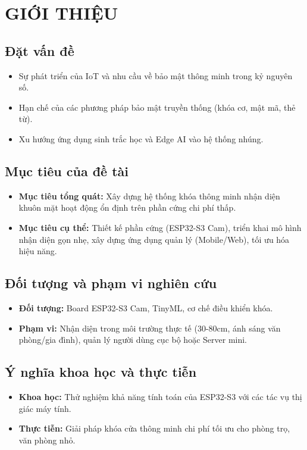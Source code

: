 \documentclass[12pt,a4paper]{report}
\begin{document}
    \chapter{GIỚI THIỆU}
    \section{Đặt vấn đề}
    \begin{itemize}
        \item Sự phát triển của IoT và nhu cầu về bảo mật thông minh trong kỷ nguyên số.
        \item Hạn chế của các phương pháp bảo mật truyền thống (khóa cơ, mật mã, thẻ từ).
        \item Xu hướng ứng dụng sinh trắc học và Edge AI vào hệ thống nhúng.
    \end{itemize}

    \section{Mục tiêu của đề tài}
    \begin{itemize}
        \item \textbf{Mục tiêu tổng quát:} Xây dựng hệ thống khóa thông minh nhận diện khuôn mặt hoạt động ổn định trên phần cứng chi phí thấp.
        \item \textbf{Mục tiêu cụ thể:} Thiết kế phần cứng (ESP32-S3 Cam), triển khai mô hình nhận diện gọn nhẹ, xây dựng ứng dụng quản lý (Mobile/Web), tối ưu hóa hiệu năng.
    \end{itemize}

    \section{Đối tượng và phạm vi nghiên cứu}
    \begin{itemize}
        \item \textbf{Đối tượng:} Board ESP32-S3 Cam, TinyML, cơ chế điều khiển khóa.
        \item \textbf{Phạm vi:} Nhận diện trong môi trường thực tế (30-80cm, ánh sáng văn phòng/gia đình), quản lý người dùng cục bộ hoặc Server mini.
    \end{itemize}

    \section{Ý nghĩa khoa học và thực tiễn}
    \begin{itemize}
        \item \textbf{Khoa học:} Thử nghiệm khả năng tính toán của ESP32-S3 với các tác vụ thị giác máy tính.
        \item \textbf{Thực tiễn:} Giải pháp khóa cửa thông minh chi phí tối ưu cho phòng trọ, văn phòng nhỏ.
    \end{itemize}
\end{document}
